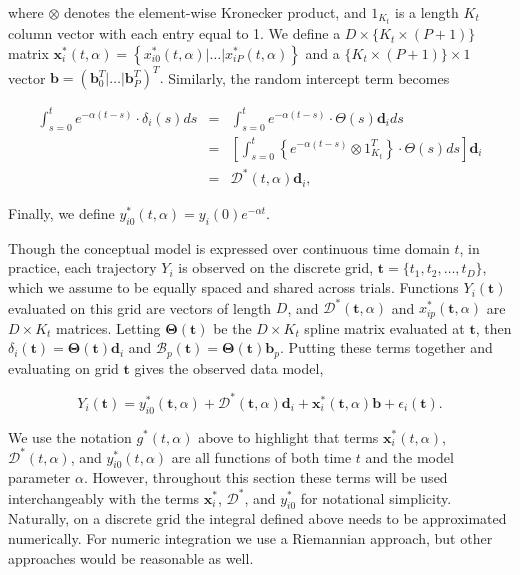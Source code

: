 \documentclass[preprint]{JASA}
\begin{document}
\noindent where \(\otimes\) denotes the element-wise Kronecker product,
and \(1_{K_t}\) is a length \(K_t\) column vector with each entry equal
to 1. We define a \(D \times \{K_t \times (P + 1)\}\) matrix
\(\mathbf{x}_i^*(t, \alpha) = \left\{x_{i0}^*(t, \alpha) | \ldots | x_{iP}^*(t, \alpha) \right\}\)
and a \(\{K_t \times (P + 1)\} \times 1\) vector
\(\mathbf{b} = \left(\mathbf{b}_0^T | \ldots | \mathbf{b}_P^T \right)^T.\)
Similarly, the random intercept term becomes

\begin{eqnarray*}
 \int_{s=0}^t e^{-\alpha (t-s)} \cdot \delta_i(s)ds &=&   \int_{s = 0}^t e^{-\alpha (t-s)} \cdot \Theta(s)\mathbf{d}_i ds\\[5mm]
&=&  \left[\int_{s = 0}^t \left\{ e^{-\alpha (t-s)}\otimes 1^T_{K_t} \right \}\cdot \Theta(s) ds\right] \mathbf{d}_i  \\[5mm]
&=& \mathcal{D}^*(t, \alpha)\mathbf{d}_i,
\end{eqnarray*}

\noindent Finally, we define
\(y_{i0}^*(t, \alpha) = y_i(0)e^{-\alpha t}\).

Though the conceptual model is expressed over continuous time domain
\(t\), in practice, each trajectory \(Y_i\) is observed on the discrete
grid, \(\mathbf{t} = \{t_1, t_2, \ldots, t_D\}\), which we assume to be
equally spaced and shared across trials. Functions \(Y_i(\mathbf{t})\)
evaluated on this grid are vectors of length \(D\), and
\(\mathcal{D}^*(\mathbf{t}, \alpha)\) and
\(x_{ip}^*(\mathbf{t}, \alpha)\) are \(D \times K_t\) matrices. Letting
\(\mathbf{\Theta}(\mathbf{t})\) be the \(D \times K_t\) spline matrix
evaluated at \(\mathbf{t}\), then
\(\delta_i(\mathbf{t}) = \mathbf{\Theta}(\mathbf{t})\mathbf{d}_i\) and
\(\mathcal{B}_p(\mathbf{t}) = \mathbf{\Theta}(\mathbf{t})\mathbf{b}_p\).
Putting these terms together and evaluating on grid \(\mathbf{t}\) gives
the observed data model,

\begin{equation}
\label{eq:observed_mod} 
    Y_i(\mathbf{t}) = y_{i0}^*(\mathbf{t}, \alpha) +  \mathcal{D}^*(\mathbf{t}, \alpha)\mathbf{d}_i +  \mathbf{x}_i^*(\mathbf{t}, \alpha)\mathbf{b} + \epsilon_i(\mathbf{t}).
\end{equation}

\noindent We use the notation \(g^*(t, \alpha)\) above to highlight that
terms \(\mathbf{x}_i^*(t, \alpha)\), \(\mathcal{D}^*(t, \alpha)\), and
\(y_{i0}^*(t, \alpha)\) are all functions of both time \(t\) and the
model parameter \(\alpha\). However, throughout this section these terms
will be used interchangeably with the terms \(\mathbf{x}_i^*\),
\(\mathcal{D}^*\), and \(y_{i0}^*\) for notational simplicity.
Naturally, on a discrete grid the integral defined above needs to be
approximated numerically. For numeric integration we use a Riemannian
approach, but other approaches would be reasonable as well.
\end{document}
